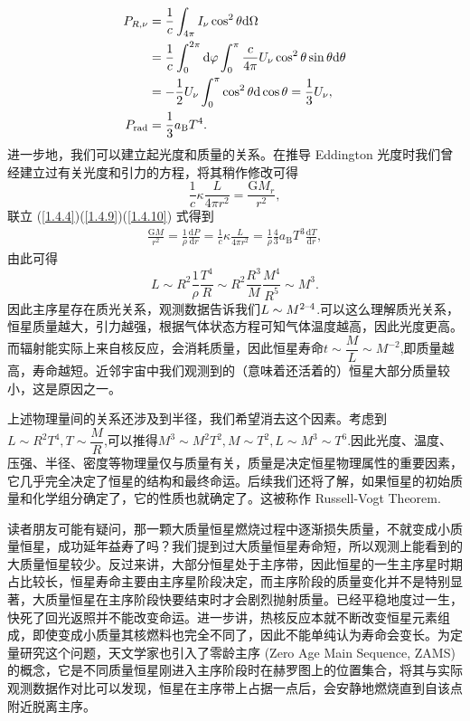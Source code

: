 \documentclass[../天体物理基础.tex]{subfiles}
\begin{document}
\begin{align}
P_{R,\nu}&=\frac{1}{c}\int_{4\pi{}}I_{\nu}\cos^{2}\theta\mathrm{d}\Omega\notag\\
&=\frac{1}{c}\int_{0}^{2\pi{}}\mathrm{d}\varphi\int_{0}^{\pi}\frac{c}{4\pi{}}U_{\nu}\cos^{2}\theta\sin\theta\mathrm{d}\theta\notag\\
&=-\frac{1}{2}U_{\nu}\int_{0}^{\pi}\cos^{2}\theta\mathrm{d}\cos\theta=\frac{1}{3}U_{\nu},\notag\\
P_{\text{rad}}&=\frac{1}{3}a_{\text{B}}T^{4}.\label{1.4.9}
\end{align}
进一步地，我们可以建立起光度和质量的关系。在推导 Eddington 光度时我们曾经建立过有关光度和引力的方程，将其稍作修改可得
\begin{equation}
\frac{1}{c}\kappa\frac{L}{4\pi r^{2}}=\frac{\mathrm{G}M_{r}}{r^{2}},\label{1.4.10}
\end{equation}
联立 (\ref{1.4.4})(\ref{1.4.9})(\ref{1.4.10}) 式得到
\begin{align}
\frac{\mathrm{G}M}{r^{2}}=\frac{1}{\rho}\frac{\mathrm{d}P}{\mathrm{d}r}=\frac{1}{c}\kappa\frac{L}{4\pi r^{2}}=\frac{1}{\rho}\frac{4}{3}a_{\text{B}}T^{3}\frac{\mathrm{d}T}{\mathrm{d}r},\label{1.4.11}
\end{align}
由此可得
\begin{equation}
L\sim R^{2}\frac{1}{\rho}\frac{T^{4}}{R}\sim R^{2}\frac{R^{3}}{M}\frac{M^{4}}{R^{5}}\sim M^{3}.
\end{equation}
因此主序星存在质光关系，观测数据告诉我们$L\sim M^{2\text{\textendash}4}$.可以这么理解质光关系，恒星质量越大，引力越强，根据气体状态方程可知气体温度越高，因此光度更高。而辐射能实际上来自核反应，会消耗质量，因此恒星寿命$t\sim\dfrac{M}{L}\sim M^{-2}$,即质量越高，寿命越短。近邻宇宙中我们观测到的（意味着还活着的）恒星大部分质量较小，这是原因之一。

上述物理量间的关系还涉及到半径，我们希望消去这个因素。考虑到$L\sim R^{2}T^{4},T\sim\dfrac{M}{R}$,可以推得$M^{3}\sim M^{2}T^{2},M\sim T^{2},L\sim M^{3}\sim T^{6}$.因此光度、温度、压强、半径、密度等物理量仅与质量有关，质量是决定恒星物理属性的重要因素，它几乎完全决定了恒星的结构和最终命运。后续我们还将了解，如果恒星的初始质量和化学组分确定了，它的性质也就确定了。这被称作 Russell-Vogt Theorem.

读者朋友可能有疑问，那一颗大质量恒星燃烧过程中逐渐损失质量，不就变成小质量恒星，成功延年益寿了吗？我们提到过大质量恒星寿命短，所以观测上能看到的大质量恒星较少。反过来讲，大部分恒星处于主序带，因此恒星的一生主序星时期占比较长，恒星寿命主要由主序星阶段决定，而主序阶段的质量变化并不是特别显著，大质量恒星在主序阶段快要结束时才会剧烈抛射质量。已经平稳地度过一生，快死了回光返照并不能改变命运。进一步讲，热核反应本就不断改变恒星元素组成，即使变成小质量其核燃料也完全不同了，因此不能单纯认为寿命会变长。为定量研究这个问题，天文学家也引入了零龄主序 (Zero Age Main Sequence, ZAMS) 的概念，它是不同质量恒星刚进入主序阶段时在赫罗图上的位置集合，将其与实际观测数据作对比可以发现，恒星在主序带上占据一点后，会安静地燃烧直到自该点附近脱离主序。
\end{document}

